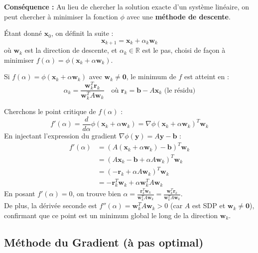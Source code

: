 \textbf{Conséquence :} Au lieu de chercher la solution exacte d'un système linéaire, on peut chercher à minimiser la fonction $\phi$ avec une \textbf{méthode de descente}.

Étant donné $\mathbf{x}_0$, on définit la suite :
$$\mathbf{x}_{k+1} = \mathbf{x}_k + \alpha_{k} \mathbf{w}_{k}$$
où $\mathbf{w}_k$ est la direction de descente, et $\alpha_k \in \mathbb{R}$ est le pas, choisi de façon à minimiser $f(\alpha) = \phi(\mathbf{x}_k + \alpha \mathbf{w}_k)$.

\begin{proposition}
Si $f(\alpha) = \phi(\mathbf{x}_k + \alpha \mathbf{w}_k)$ avec $\mathbf{w}_k \neq \mathbf{0}$, le minimum de $f$ est atteint en :
$$\alpha_k = \frac{\mathbf{w}_k^T \mathbf{r}_k}{\mathbf{w}_k^T A \mathbf{w}_k} \quad \text{où } \mathbf{r}_k = \mathbf{b} - A\mathbf{x}_k \text{ (le résidu)}$$
\end{proposition}

\begin{explication}
Cherchons le point critique de $f(\alpha)$ :
$$f'(\alpha) = \frac{d}{d\alpha} \phi(\mathbf{x}_k + \alpha \mathbf{w}_k) = \nabla \phi(\mathbf{x}_k + \alpha \mathbf{w}_k)^T \mathbf{w}_k$$
En injectant l'expression du gradient $\nabla \phi(\mathbf{y}) = A\mathbf{y} - \mathbf{b}$ :
\begin{align*}
f'(\alpha) &= (A(\mathbf{x}_k + \alpha \mathbf{w}_k) - \mathbf{b})^T \mathbf{w}_k \\
&= (A\mathbf{x}_k - \mathbf{b} + \alpha A\mathbf{w}_k)^T \mathbf{w}_k \\
&= (-\mathbf{r}_k + \alpha A\mathbf{w}_k)^T \mathbf{w}_k \\
&= -\mathbf{r}_k^T \mathbf{w}_k + \alpha \mathbf{w}_k^T A \mathbf{w}_k
\end{align*}
En posant $f'(\alpha) = 0$, on trouve bien $\alpha = \frac{\mathbf{r}_k^T \mathbf{w}_k}{\mathbf{w}_k^T A \mathbf{w}_k} = \frac{\mathbf{w}_k^T \mathbf{r}_k}{\mathbf{w}_k^T A \mathbf{w}_k}$. \\
De plus, la dérivée seconde est $f''(\alpha) = \mathbf{w}_k^T A \mathbf{w}_k > 0$ (car $A$ est SDP et $\mathbf{w}_k \neq \mathbf{0}$), confirmant que ce point est un minimum global le long de la direction $\mathbf{w}_k$.
\end{explication}

\subsection{Méthode du Gradient (à pas optimal)}

